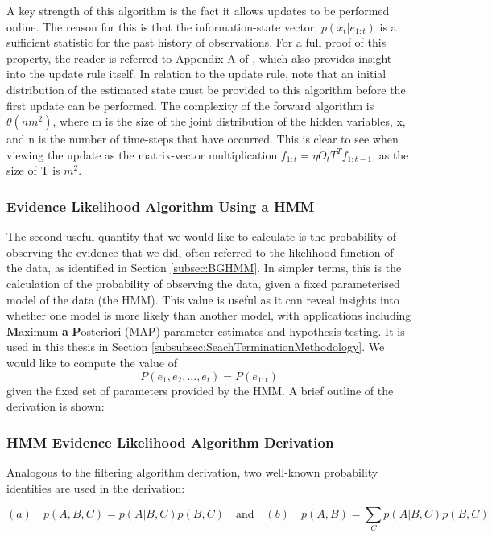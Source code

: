 A key strength of this algorithm is the fact it allows updates to be performed online. The reason for this is that the information-state vector, $p(x_t | e_{1:t})$ is a sufficient statistic for the past history of observations. For a full proof of this property, the reader is referred to Appendix A of \cite{Smallwood1973TheHorizon}, which also provides insight into the update rule itself. In relation to the update rule, note that an initial distribution of the estimated state must be provided to this algorithm before the first update can be performed. The complexity of the forward algorithm is $\theta (nm^2)$, where m is the size of the joint distribution of the hidden variables, x, and n is the number of time-steps that have occurred. This is clear to see when viewing the update as the matrix-vector multiplication $f_{1:t} = \eta O_{t} T^{T} f_{1:t-1}$, as the size of T is $m^2$.






\subsubsection{Evidence Likelihood Algorithm Using a HMM}\label{subsubsec:EvLikelihood}
The second useful quantity that we would like to calculate is the probability of observing the evidence that we did, often referred to the likelihood function of the data, as identified in Section \ref{subsec:BGHMM}. In simpler terms, this is the calculation of the probability of observing the data, given a fixed parameterised model of the data (the HMM). This value is useful as it can reveal insights into whether one model is more likely than another model, with applications including \textbf{M}aximum \textbf{a} \textbf{P}osteriori (MAP) parameter estimates and hypothesis testing. It is used in this thesis in Section \ref{subsubsec:SeachTerminationMethodology}. We would like to compute the value of
\[P(e_1, e_2, ..., e_t) = P(e_{1:t})\]
given the fixed set of parameters provided by the HMM. A brief outline of the derivation is shown: 


\subsubsection{HMM Evidence Likelihood Algorithm Derivation}\label{subsubsec:BGEvidenceLikelihood}

Analogous to the filtering algorithm derivation, two well-known probability identities are used in the derivation: 
\begin{center}
\end{center}
\[(a) \quad p(A, B, C) = p(A | B, C) p(B, C) \quad \text{and} \quad (b) \quad p(A, B) = \sum_{C}{p(A | B, C)p(B, C)}\]

